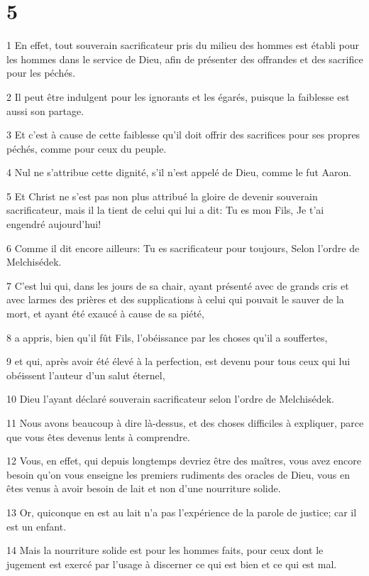 \chapter{5}

\par 1 En effet, tout souverain sacrificateur pris du milieu des hommes est établi pour les hommes dans le service de Dieu, afin de présenter des offrandes et des sacrifice pour les péchés.
\par 2 Il peut être indulgent pour les ignorants et les égarés, puisque la faiblesse est aussi son partage.
\par 3 Et c'est à cause de cette faiblesse qu'il doit offrir des sacrifices pour ses propres péchés, comme pour ceux du peuple.
\par 4 Nul ne s'attribue cette dignité, s'il n'est appelé de Dieu, comme le fut Aaron.
\par 5 Et Christ ne s'est pas non plus attribué la gloire de devenir souverain sacrificateur, mais il la tient de celui qui lui a dit: Tu es mon Fils, Je t'ai engendré aujourd'hui!
\par 6 Comme il dit encore ailleurs: Tu es sacrificateur pour toujours, Selon l'ordre de Melchisédek.
\par 7 C'est lui qui, dans les jours de sa chair, ayant présenté avec de grands cris et avec larmes des prières et des supplications à celui qui pouvait le sauver de la mort, et ayant été exaucé à cause de sa piété,
\par 8 a appris, bien qu'il fût Fils, l'obéissance par les choses qu'il a souffertes,
\par 9 et qui, après avoir été élevé à la perfection, est devenu pour tous ceux qui lui obéissent l'auteur d'un salut éternel,
\par 10 Dieu l'ayant déclaré souverain sacrificateur selon l'ordre de Melchisédek.
\par 11 Nous avons beaucoup à dire là-dessus, et des choses difficiles à expliquer, parce que vous êtes devenus lents à comprendre.
\par 12 Vous, en effet, qui depuis longtemps devriez être des maîtres, vous avez encore besoin qu'on vous enseigne les premiers rudiments des oracles de Dieu, vous en êtes venus à avoir besoin de lait et non d'une nourriture solide.
\par 13 Or, quiconque en est au lait n'a pas l'expérience de la parole de justice; car il est un enfant.
\par 14 Mais la nourriture solide est pour les hommes faits, pour ceux dont le jugement est exercé par l'usage à discerner ce qui est bien et ce qui est mal.

